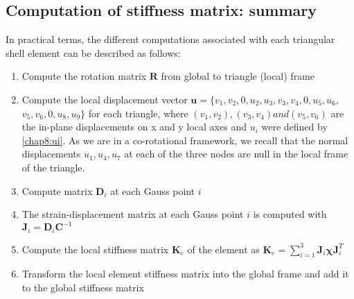 \subsection{Computation of stiffness matrix: summary}	\label{chap8:summary}
In practical terms, the different computations associated with each triangular shell element can be described as follows:
%
\begin{enumerate}
\item Compute the rotation matrix $\textbf{R}$ from global to triangle (local) frame
\item Compute the local displacement vector $\textbf{u} = \{v_1, v_2, 0, u_2, u_3, v_3, v_4, 0, u_5, u_6,$ $v_5, v_6, 0, u_8, u_9 \} $ for each triangle, where $ (v_1, v_2), (v_3, v_4) and (v_5, v_6) $ are the in-plane displacements on x and y local axes and $ u_i $ were defined by \eqref{chap8:ui}. As we are in a co-rotational framework, we recall that the normal displacements $u_1, u_4, u_7$ at each of the three nodes are null in the local frame of the triangle. 
\item Compute matrix $\textbf{D}_i$  at each Gauss point $i$
\item The strain-displacement matrix at each Gauss point $i$ is computed with $\textbf{J}_i = \textbf{D}_i \textbf{C}^{-1}$
\item Compute the local stiffness matrix $\textbf{K}_e$ of the element as $\textbf{K}_e = \displaystyle{\sum^3_{i=1}} \textbf{J}_i \boldsymbol\chi \textbf{J}_i^T$
\item Transform the local element stiffness matrix into the global frame and add it to the global stiffness matrix
\end{enumerate}


